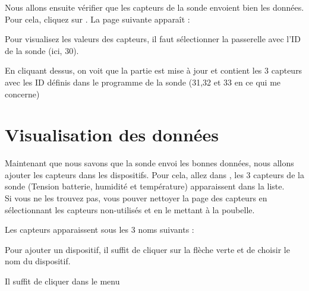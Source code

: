 


Nous allons ensuite vérifier que les capteurs de la sonde envoient bien les données. Pour cela, cliquez sur .
La page suivante apparaît : 


Pour visualisez les valeurs des capteurs, il faut sélectionner la passerelle avec l'ID de la sonde (ici, 30).


En cliquant dessus, on voit que la partie  est mise à jour et contient les 3 capteurs avec les ID définis dans le programme de la sonde (31,32 et 33 en ce qui me concerne)



\section{Visualisation des données}

Maintenant que nous savons que la sonde envoi les bonnes données, nous allons ajouter les capteurs dans les dispositifs.
Pour cela, allez dans , les 3 capteurs de la sonde (Tension batterie, humidité et température) apparaissent dans la liste.\\
Si vous ne les trouvez pas, vous pouver nettoyer la page des capteurs en sélectionnant les capteurs non-utilisés et en le mettant à la poubelle.


Les capteurs apparaissent sous les 3 noms suivants : 


Pour ajouter un dispositif, il suffit de cliquer sur la flèche verte et de choisir le nom du dispositif.



Il suffit de cliquer dans le menu 


